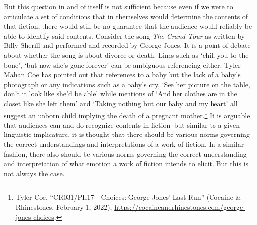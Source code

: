 \documentclass[
  12pt,
]{book}
\theoremstyle{definition}
\theoremstyle{definition}
\theoremstyle{definition}
\theoremstyle{definition}
\theoremstyle{remark}
\begin{document}
But this question in and of itself is not sufficient because even if we were to articulate a set of conditions that in themselves would determine the contents of that fiction, there would still be no guarantee that the audience would reliably be able to identify said contents. Consider the song \emph{The Grand Tour} as written by Billy Sherill and performed and recorded by George Jones. It is a point of debate about whether the song is about divorce or death. Lines such as `chill you to the bone', `but now she's gone forever' can be ambiguous referencing either. Tyler Mahan Coe has pointed out that references to a baby but the lack of a baby's photograph or any indications such as a baby's cry, `See her picture on the table, don't it look like she'd be able' while mentions of `And her clothes are in the closet like she left them' and `Taking nothing but our baby and my heart' all suggest an unborn child implying the death of a pregnant mother.\footnote{Tyler Coe, {``{CR031}/{PH17} - {Choices}: {George Jones}' {Last Run}''} (Cocaine \& Rhinestones, February 1, 2022), \url{https://cocaineandrhinestones.com/george-jones-choices}.} It is arguable that audiences can and do recognize contents in fiction, but similar to a given linguistic implicature, it is thought that there should be various norms governing the correct understandings and interpretations of a work of fiction. In a similar fashion, there also should be various norms governing the correct understanding and interpretation of what emotion a work of fiction intends to elicit. But this is not always the case.
\end{document}
